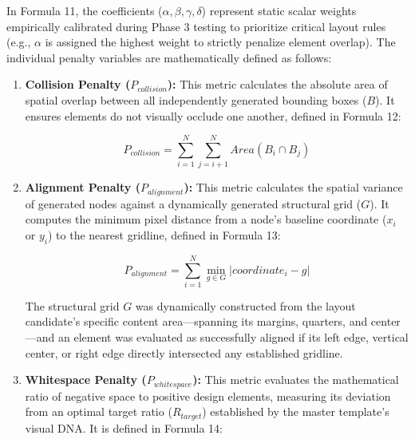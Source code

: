 \begin{refsection}
In Formula 11, the coefficients ($\alpha, \beta, \gamma, \delta$) represent static scalar weights empirically calibrated during Phase 3 testing to prioritize critical layout rules (e.g., $\alpha$ is assigned the highest weight to strictly penalize element overlap). The individual penalty variables are mathematically defined as follows:

\begin{enumerate}
    \item \textbf{Collision Penalty ($P_{collision}$):} This metric calculates the absolute area of spatial overlap between all independently generated bounding boxes ($B$). It ensures elements do not visually occlude one another, defined in Formula 12:

    \begin{center}
    \begin{minipage}{0.8\textwidth}
    \begin{equation}
    P_{collision} = \sum_{i=1}^{N} \sum_{j=i+1}^{N} Area(B_i \cap B_j)
    \end{equation}
    \centering
    \end{minipage}
    \end{center}
	
	\item \textbf{Alignment Penalty ($P_{alignment}$):} This metric calculates the spatial variance of generated nodes against a dynamically generated structural grid ($G$). It computes the minimum pixel distance from a node's baseline coordinate ($x_i$ or $y_i$) to the nearest gridline, defined in Formula 13:
    
    \begin{center}
    \begin{minipage}{0.8\textwidth}
    \begin{equation}
    P_{alignment} = \sum_{i=1}^{N} \min_{g \in G} | coordinate_i - g |
    \end{equation}
    \centering
    \end{minipage}
    \end{center}

    The structural grid $G$ was dynamically constructed from the layout candidate's specific content area—spanning its margins, quarters, and center—and an element was evaluated as successfully aligned if its left edge, vertical center, or right edge directly intersected any established gridline. 

	\item \textbf{Whitespace Penalty ($P_{whitespace}$):} This metric evaluates the mathematical ratio of negative space to positive design elements, measuring its deviation from an optimal target ratio ($R_{target}$) established by the master template's visual DNA. It is defined in Formula 14:
    

\end{enumerate}
\end{refsection}
